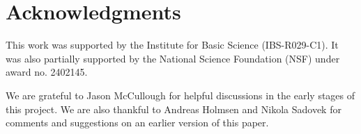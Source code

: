 \documentclass[a4paper, 10pt, reqno, english, ones]{amsart}  %
\theoremstyle{definition}
\theoremstyle{remark}
\begin{document}
\section{Acknowledgments}
This work was supported by the Institute for Basic Science (IBS-R029-C1). It was also partially supported by the National Science Foundation (NSF) under award no. 2402145.

We are grateful to Jason McCullough for helpful discussions in the early stages of this project. We are also thankful to Andreas Holmsen and Nikola Sadovek for comments and suggestions on an earlier version of this paper.







\end{document}
